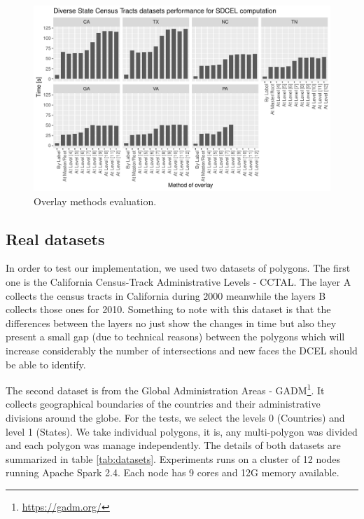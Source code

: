 \begin{figure}[!ht]
    \centering
    \includegraphics[width=\linewidth]{figures/experiments/States.pdf}
    \caption{Overlay methods evaluation.}\label{fig:states}
\end{figure}

\subsection{Real datasets}
In order to test our implementation, we used two datasets of polygons.  The first one is the California Census-Track Administrative Levels - CCTAL. The layer A collects the census tracts in California during 2000 meanwhile the layers B collects those ones for 2010.  Something to note with this dataset is that the differences between the layers no just show the changes in time but also they present a small gap (due to technical reasons) between the polygons which will increase considerably the number of intersections and new faces the DCEL should be able to identify.

The second dataset is from the Global Administration Areas - GADM\footnote{\url{https://gadm.org/}}. It collects geographical boundaries of the countries and their administrative divisions around the globe.  For the tests, we select the levels 0 (Countries) and level 1 (States). We take individual polygons, it is, any multi-polygon was divided and each polygon was manage independently. The details of both datasets are summarized in table \ref{tab:datasets}.  Experiments runs on a cluster of 12 nodes running Apache Spark 2.4.  Each node has 9 cores and 12G memory available.

